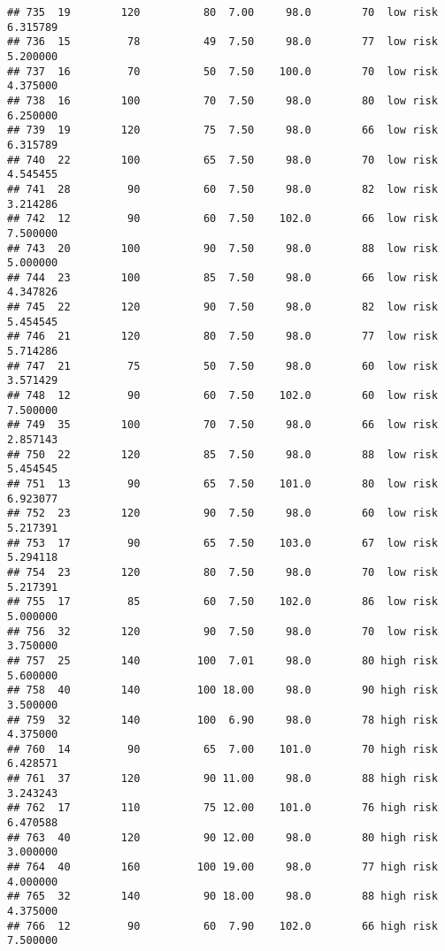 \documentclass[
  ignorenonframetext,
]{beamer}
\begin{document}
\begin{frame}[fragile]
\begin{verbatim}
## 735  19        120          80  7.00     98.0        70  low risk      6.315789
## 736  15         78          49  7.50     98.0        77  low risk      5.200000
## 737  16         70          50  7.50    100.0        70  low risk      4.375000
## 738  16        100          70  7.50     98.0        80  low risk      6.250000
## 739  19        120          75  7.50     98.0        66  low risk      6.315789
## 740  22        100          65  7.50     98.0        70  low risk      4.545455
## 741  28         90          60  7.50     98.0        82  low risk      3.214286
## 742  12         90          60  7.50    102.0        66  low risk      7.500000
## 743  20        100          90  7.50     98.0        88  low risk      5.000000
## 744  23        100          85  7.50     98.0        66  low risk      4.347826
## 745  22        120          90  7.50     98.0        82  low risk      5.454545
## 746  21        120          80  7.50     98.0        77  low risk      5.714286
## 747  21         75          50  7.50     98.0        60  low risk      3.571429
## 748  12         90          60  7.50    102.0        60  low risk      7.500000
## 749  35        100          70  7.50     98.0        66  low risk      2.857143
## 750  22        120          85  7.50     98.0        88  low risk      5.454545
## 751  13         90          65  7.50    101.0        80  low risk      6.923077
## 752  23        120          90  7.50     98.0        60  low risk      5.217391
## 753  17         90          65  7.50    103.0        67  low risk      5.294118
## 754  23        120          80  7.50     98.0        70  low risk      5.217391
## 755  17         85          60  7.50    102.0        86  low risk      5.000000
## 756  32        120          90  7.50     98.0        70  low risk      3.750000
## 757  25        140         100  7.01     98.0        80 high risk      5.600000
## 758  40        140         100 18.00     98.0        90 high risk      3.500000
## 759  32        140         100  6.90     98.0        78 high risk      4.375000
## 760  14         90          65  7.00    101.0        70 high risk      6.428571
## 761  37        120          90 11.00     98.0        88 high risk      3.243243
## 762  17        110          75 12.00    101.0        76 high risk      6.470588
## 763  40        120          90 12.00     98.0        80 high risk      3.000000
## 764  40        160         100 19.00     98.0        77 high risk      4.000000
## 765  32        140          90 18.00     98.0        88 high risk      4.375000
## 766  12         90          60  7.90    102.0        66 high risk      7.500000

\end{verbatim}
\end{frame}
\end{document}
